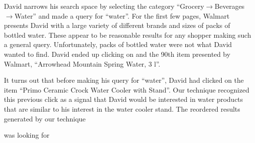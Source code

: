\documentclass{article}
\begin{document}
David narrows his search space by selecting the category
``Grocery$\rightarrow$Beverages$\rightarrow$Water'' and made a query for
``water''. For the first few pages, Walmart presents David with a large
variety of different brands and sizes of packs of bottled water. These appear to
be reasonable results for any shopper making such a general query.
Unfortunately, packs of bottled water were not what David wanted to find. David
ended up clicking on and the 90th item presented by Walmart, ``Arrowhead
Mountain Spring Water, 3 l''. %

It turns out that before making his query for ``water'', David had clicked on
the item ``Primo Ceramic Crock Water Cooler with Stand''. %
Our technique recognized this previous click as a signal that David would be
interested in water products that are similar to his interest in the water
cooler stand. The reordered results generated by our technique 

was looking for 
\end{document}
